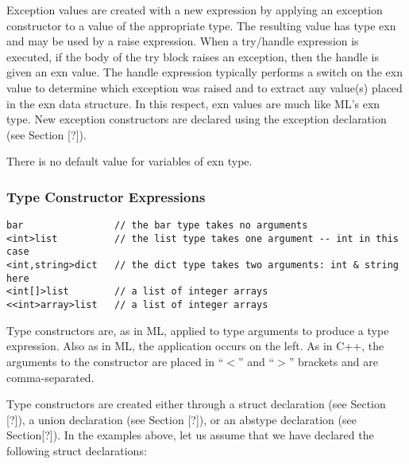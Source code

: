 \documentclass[titlepage,10pt]{article}
\begin{document}
Exception values are created with a new expression by applying an
exception constructor to a value of the appropriate type.  The resulting
value has type exn and may be used by a raise expression.  When a
try/handle expression is executed, if the body of the try block raises
an exception, then the handle is given an exn value.  The handle
expression typically performs a switch on the exn value to determine
which exception was raised and to extract any value(s) placed in the exn
data structure.  In this respect, exn values are much like ML's exn
type.  New exception constructors are declared using the exception
declaration (see Section [?]).

There is no default value for variables of exn type.

\subsubsection{Type Constructor Expressions}


\begin{verbatim}
bar                // the bar type takes no arguments
<int>list          // the list type takes one argument -- int in this case
<int,string>dict   // the dict type takes two arguments: int & string here
<int[]>list        // a list of integer arrays
<<int>array>list   // a list of integer arrays
\end{verbatim}

Type constructors are, as in ML, applied to type arguments to produce a
type expression.  Also as in ML, the application occurs on the left.  As
in C++, the arguments to the constructor are placed in ``$<$'' and
``$>$'' brackets and are comma-separated.

Type constructors are created either through a struct declaration (see
Section [?]), a union declaration (see Section [?]), or an abstype
declaration (see Section[?]).  In the examples above, let us assume that
we have declared the following struct declarations:
\end{document}
